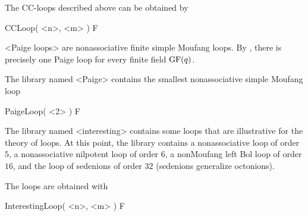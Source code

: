 The CC-loops described above can be obtained by

\>CCLoop( <n>, <m> ) F


<Paige loops> are nonassociative finite simple
Moufang loops. By \cite{Li}, there is precisely one Paige loop for every finite
field ${\rm{GF}}(q)$.

The library named <Paige> contains the smallest nonassociative simple Moufang
loop

\>PaigeLoop( <2> ) F


The library named <interesting> contains some loops that are
illustrative for the theory of loops. At this point, the library contains a
nonassociative loop of order $5$, a nonassociative nilpotent loop of order $6$,
a nonMoufang left Bol loop of order $16$, and the loop of
sedenions of order $32$ (sedenions generalize octonions).

The loops are obtained with

\>InterestingLoop( <n>, <m> ) F
